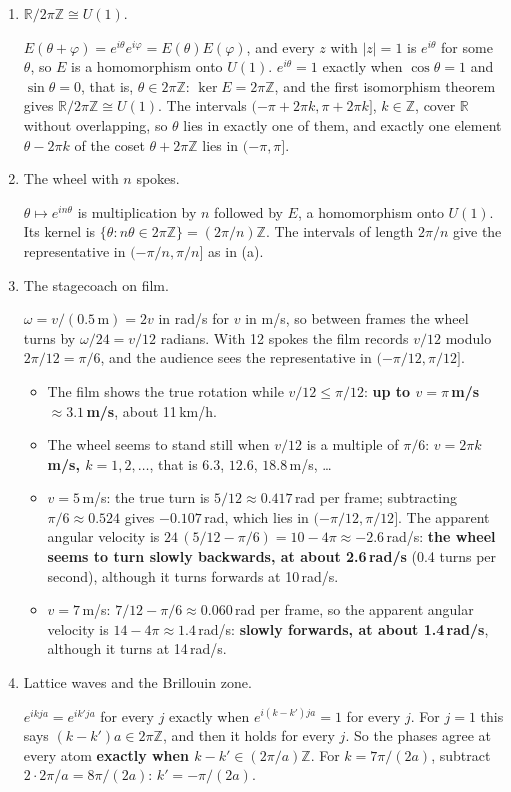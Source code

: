 \documentclass[11pt,a4paper]{article}
\newcommand{\Z}{\mathbb{Z}}
\newcommand{\R}{\mathbb{R}}
\newcommand{\prob}[1]{\par\vspace{1.1em}\noindent{\bfseries\large #1}\par\vspace{0.1em}}
\newenvironment{parts}{\begin{enumerate}[label=\textbf{(\alph*)},leftmargin=2.2em,itemsep=0.6em,topsep=0.2em]}{\end{enumerate}}
\newcommand{\pq}[1]{\item {\color{black!60}#1}\par}
\newcommand{\ans}[1]{{\boldmath\bfseries #1}}
\begin{document}
\prob{3. Angles, spokes and the wagon-wheel effect}
\begin{parts}
\pq{$\R/2\pi\Z \cong U(1)$.}
$E(\theta + \varphi) = e^{i\theta} e^{i\varphi} = E(\theta) E(\varphi)$, and every $z$ with $|z| = 1$ is $e^{i\theta}$ for some $\theta$, so $E$ is a homomorphism onto $U(1)$. $e^{i\theta} = 1$ exactly when $\cos\theta = 1$ and $\sin\theta = 0$, that is, $\theta \in 2\pi\Z$: \ans{$\ker E = 2\pi\Z$}, and the first isomorphism theorem gives \ans{$\R/2\pi\Z \cong U(1)$}. The intervals $(-\pi + 2\pi k, \pi + 2\pi k]$, $k \in \Z$, cover $\R$ without overlapping, so $\theta$ lies in exactly one of them, and exactly one element $\theta - 2\pi k$ of the coset $\theta + 2\pi\Z$ lies in $(-\pi, \pi]$.

\pq{The wheel with $n$ spokes.}
$\theta \mapsto e^{in\theta}$ is multiplication by $n$ followed by $E$, a homomorphism onto $U(1)$. Its kernel is $\{\theta : n\theta \in 2\pi\Z\} = (2\pi/n)\Z$. The intervals of length $2\pi/n$ give the representative in $(-\pi/n, \pi/n]$ as in (a).

\pq{The stagecoach on film.}
$\omega = v/(0.5\,\text{m}) = 2v$ in rad/s for $v$ in m/s, so between frames the wheel turns by $\omega/24 = v/12$ radians. With 12 spokes the film records $v/12$ modulo $2\pi/12 = \pi/6$, and the audience sees the representative in $(-\pi/12, \pi/12]$.
\begin{itemize}
  \item The film shows the true rotation while $v/12 \le \pi/12$: \ans{up to $v = \pi$\,m/s $\approx 3.1$\,m/s}, about 11\,km/h.
  \item The wheel seems to stand still when $v/12$ is a multiple of $\pi/6$: \ans{$v = 2\pi k$\,m/s, $k = 1, 2, \dots$}, that is $6.3$, $12.6$, $18.8$\,m/s, \dots
  \item $v = 5$\,m/s: the true turn is $5/12 \approx 0.417$\,rad per frame; subtracting $\pi/6 \approx 0.524$ gives $-0.107$\,rad, which lies in $(-\pi/12, \pi/12]$. The apparent angular velocity is $24\,(5/12 - \pi/6) = 10 - 4\pi \approx -2.6$\,rad/s: \ans{the wheel seems to turn slowly backwards, at about 2.6\,rad/s} (0.4 turns per second), although it turns forwards at 10\,rad/s.
  \item $v = 7$\,m/s: $7/12 - \pi/6 \approx 0.060$\,rad per frame, so the apparent angular velocity is $14 - 4\pi \approx 1.4$\,rad/s: \ans{slowly forwards, at about 1.4\,rad/s}, although it turns at 14\,rad/s.
\end{itemize}

\pq{Lattice waves and the Brillouin zone.}
$e^{ikja} = e^{ik'ja}$ for every $j$ exactly when $e^{i(k - k')ja} = 1$ for every $j$. For $j = 1$ this says $(k - k')a \in 2\pi\Z$, and then it holds for every $j$. So the phases agree at every atom \ans{exactly when $k - k' \in (2\pi/a)\Z$}. For $k = 7\pi/(2a)$, subtract $2 \cdot 2\pi/a = 8\pi/(2a)$: \ans{$k' = -\pi/(2a)$}.
\end{parts}
\end{document}
